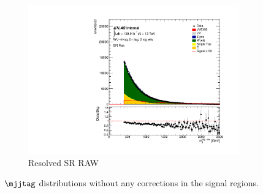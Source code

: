 \begin{figure}[ht]
\begin{subfigure}[b]{0.3\textwidth}
        \centering
        \includegraphics[width=\textwidth]{figures/mjjreweight1lep/SR_Res/stacked_plot_resolved_tagMjj_MjjWeightResolved.pdf}
        \caption{Resolved SR RAW}
        \label{fig:MC16ADE_Resolved_SR_Before}
    \end{subfigure}
    \caption{\(\mjjtag\) distributions without any corrections in the signal regions.}
    \label{fig:mjjReweight1LepMjjDistBefore}
\end{figure}

